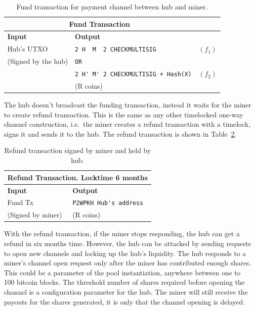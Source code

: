 \documentclass{article}
\begin{document}
\begin{table}
  \centering
  \begin{tabular}{ llr }
    \multicolumn{2}{c}{\bfseries Fund Transaction} \\
    \midrule
    \bfseries Input & \bfseries Output \\
    \midrule
    Hub's UTXO & \verb|2 H  M  2 CHECKMULTISIG| & $(f_1)$ \\
    (Signed by the hub) & \verb|OR| \\
                    & \verb|2 H' M' 2 CHECKMULTISIG + Hash(X)| & $(f_2)$ \\
    & (R coins) \\
    \midrule
  \end{tabular}
  \caption{Fund transaction for payment channel between hub and miner.}\label{fund-tx}
\end{table}


The hub doesn't broadcast the funding transaction, instead it waits
for the miner to create refund transaction. This is the same as any
other timelocked one-way channel construction, i.e.\ the miner creates
a refund transaction with a timelock, signs it and sends it to the
hub. The refund transaction is shown in Table~\ref{refund-tx}.

\begin{table}
  \centering
  \begin{tabular}{ ll }
    \multicolumn{2}{c}{\bfseries Refund Transaction. Locktime 6 months} \\
    \midrule
    \bfseries Input & \bfseries Output \\
    \midrule
    Fund Tx & \verb|P2WPKH Hub's address| \\
    (Signed by miner) & (R coins) \\
    \midrule
  \end{tabular}
  \caption{Refund transaction signed by miner and held by
    hub.}\label{refund-tx}
\end{table}

With the refund transaction, if the miner stops responding, the hub
can get a refund in six months time. However, the hub can be attacked
by sending requests to open new channels and locking up the hub's
liquidity. The hub responds to a miner's channel open request only
after the miner has contributed enough shares. This could be a
parameter of the pool instantiation, anywhere between one to 100
bitcoin blocks. The threshold number of shares required before opening
the channel is a configuration parameter for the hub. The miner will
still receive the payouts for the shares generated, it is only that
the channel opening is delayed.
\end{document}
